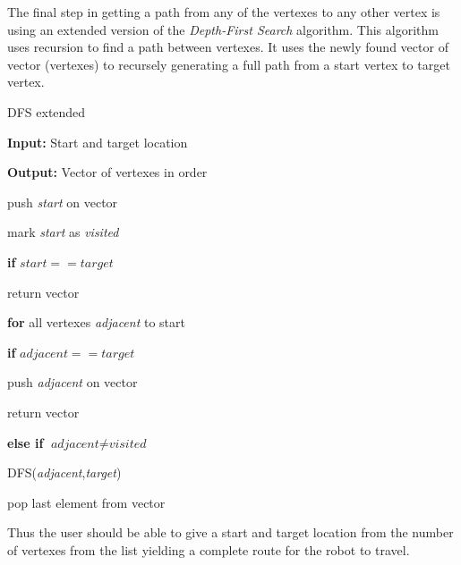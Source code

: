 \documentclass[../Head/Main.tex]{subfiles}
\begin{document}
The final step in getting a path from any of the vertexes to any other vertex is using an extended version of the \textit{Depth-First Search} algorithm. This algorithm uses recursion to find a path between vertexes. It uses the newly found vector of vector (vertexes) to recursely generating a full path from a start vertex to target vertex. 

   
\begin{Pseudo}{DFS extended}{}

\textbf{Input:} Start and target location 

\textbf{Output:} Vector of vertexes in order


	\begin{Indentation}
		\item push \textit{start} on vector 
		\item mark \textit{start} as \textit{visited} 
		\item[ ] 
		\item \textbf{if} $\textit{start}==\textit{target}$
		\item return vector
		\item[ ]
	\item \textbf{for} all vertexes \textit{adjacent} to start
	\item \textbf{if} $\textit{adjacent}==\textit{target}$
		\item push \textit{adjacent} on vector 
		\item return vector
		\item[ ]
	\item \textbf{else if} $\textit{adjacent}\neq\textit{visited}$
	\item DFS(\textit{adjacent},\textit{target})
	\item pop last element from vector 

	\end{Indentation}
	
	
\end{Pseudo} 

Thus the user should be able to give a start and target location from the number of vertexes from the list yielding a complete route for the robot to travel.
\end{document}
